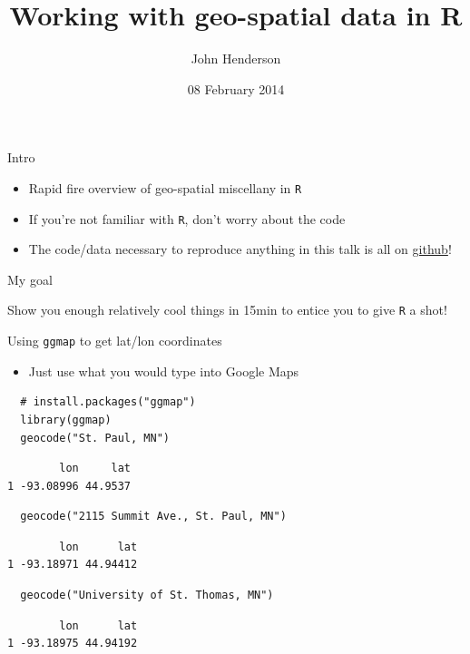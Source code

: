 \documentclass[sans,aspectratio=169,presentation,bigger,fleqn]{beamer}
\author{John Henderson}
\date{08 February 2014}
\title{Working with geo-spatial data in R}
\begin{document}
\maketitle


\begin{frame}[fragile,label=sec-1]{Intro}
 \begin{itemize}
\item Rapid fire overview of geo-spatial miscellany in \texttt{R}
\item If you're not familiar with \texttt{R}, don't worry about the code
\item The code/data necessary to reproduce anything in this talk is all on \href{https://github.com/jwhendy/devFest-geo}{github}!
\end{itemize}

\vspace{1cm} \pause

\alert{My goal}

Show you enough relatively cool things in 15min to entice you to give \texttt{R} a shot!
\end{frame}
\begin{frame}[fragile,label=sec-2]{Using \texttt{ggmap} to get lat/lon coordinates}
 \begin{itemize}
\item Just use what you would type into Google Maps
\end{itemize}


\scriptsize

\begin{verbatim}
  # install.packages("ggmap")
  library(ggmap)
  geocode("St. Paul, MN")
\end{verbatim}
\begin{verbatim}
        lon     lat
1 -93.08996 44.9537
\end{verbatim}

\begin{verbatim}
  geocode("2115 Summit Ave., St. Paul, MN")
\end{verbatim}
\begin{verbatim}
        lon      lat
1 -93.18971 44.94412
\end{verbatim}

\begin{verbatim}
  geocode("University of St. Thomas, MN")
\end{verbatim}
\begin{verbatim}
        lon      lat
1 -93.18975 44.94192
\end{verbatim}

\normalsize
\end{frame}
\end{document}
